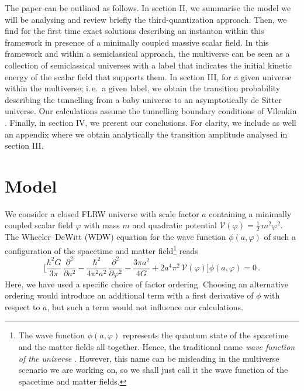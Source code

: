 \documentclass[aps,nofootinbib,prd,superscriptaddress,eqsecnum,showpacs,showkeys,preprintnumbers,altaffilletter]{revtex4}
\def\del{\partial}
\def\be{\begin{equation}}
\def\ee{\end{equation}}
\begin{document}
The paper can be outlined as follows. In section II, we summarise the model we will be analysing and review briefly the third-quantization approach.  Then, we find for the first time exact solutions describing an instanton within this framework in presence of a minimally coupled massive scalar field. In this framework and within a semiclassical approach, the multiverse can be seen as a collection of semiclassical universes with a label that indicates the initial kinetic energy of the scalar field that supports them. In section III, for a given universe within the multiverse; i.\,e.~a given label, we obtain the transition probability describing  the tunnelling from a baby universe to an asymptotically de Sitter universe. Our calculations assume the tunnelling boundary conditions of Vilenkin \cite{Vilenkin:1984wp, Vilenkin}. Finally, in section IV, we present our conclusions. For clarity, we include as well an appendix where we obtain analytically the transition amplitude analysed in section III.


%
%

\section{Model}

We consider a closed FLRW universe with scale factor $a$ containing a minimally coupled scalar field $\varphi$ with mass $m$ and quadratic potential $\mathcal{V}(\varphi) = \frac{1}{2}\,m^2\varphi^2$. The Wheeler--DeWitt (WDW) equation for the wave function $\phi(a,\varphi)$ of such a configuration of the spacetime and matter field\footnote{The wave function $\phi(a,\varphi)$ represents the quantum state of the spacetime and the matter fields all together. Hence, the traditional name \emph{wave function of the universe} \cite{Hartle1983}. However, this name can be misleading in the multiverse scenario we are working on, so we shall just call it the wave function of the spacetime and matter fields.} reads \cite{Linde:2005ht}
\be \label{basicwdw}
\Biggl[\frac{\hbar^2 G}{3\pi}\,\frac{\del^2}{\del a^2} - \frac{\hbar^2}{4\pi^2 a^2}\,\frac{\del^2}{\del \varphi^2} - \frac{3\pi a^2}{4 G}+2a^4\pi^2 \,\mathcal{V}(\varphi) \Biggr]\phi(a,\varphi) = 0\,.
\ee
Here, we have used a specific choice of factor ordering. Choosing an alternative ordering would introduce an additional term with a first derivative of  $\phi$ with respect to $a$, but such a term would not influence our calculations.
\end{document}
